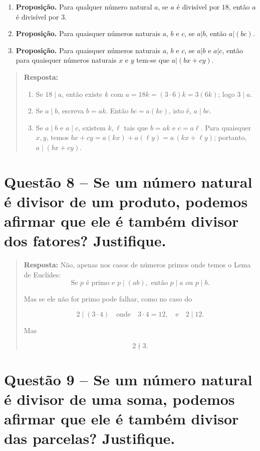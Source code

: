 \documentclass[12pt,a4paper]{article}
\newcommand{\answer}[1]{\begin{quote}#1\end{quote}}
\begin{document}
    \begin{enumerate}[label= (\alph*)]
        \item \textbf{Proposição.} Para qualquer número natural $a$, se $a$ é divisível por $18$, então $a$ é divisível por $3$.

        \item \textbf{Proposição.} Para quaisquer números naturais $a$, $b$ e $c$, se $a | b$, então $a | (bc)$.

        \item \textbf{Proposição.} Para quaisquer números naturais $a$, $b$ e $c$, se $a | b$ e $a | c$, então para quaisquer números naturais $x$ e $y$ tem-se que $a | (bx + cy)$.
    \end{enumerate}
    \answer{\textbf{Resposta:}
        \begin{enumerate}[label= (\alph*)]
            \item Se $18 \mid a$, então existe $k$ com $a = 18k = (3\cdot 6)k = 3(6k)$; logo $3 \mid a$.
            \item Se $a \mid b$, escreva $b = a k$. Então $bc = a (k c)$, isto é, $a \mid bc$.
            \item Se $a \mid b$ e $a \mid c$, existem $k,\ell$ tais que $b = a k$ e $c = a \ell$. Para quaisquer $x,y$, temos $bx + cy = a(kx) + a(\ell y) = a\,(kx + \ell y)$; portanto, $a \mid (bx + cy)$.
        \end{enumerate}
    }

\section*{Questão 8 -- Se um número natural é divisor de um produto, podemos afirmar que ele é também divisor dos fatores? Justifique.}
    
    \answer{\textbf{Resposta:} Não, apenas nos casos de números primos onde temos o Lema de Euclides: 
        \[
        \text{Se } p \text{ é primo e } p \mid (ab), \text{ então } p \mid a \text{ ou } p \mid b.
        \]
        
        Mas se ele não for primo pode falhar, como no caso do
        
        \[
        2 \mid (3 \cdot 4) \quad \text{onde} \quad 3 \cdot 4 = 12, \quad \text{e} \quad 2 \mid 12.
        \]
        
        Mas 
        
        \[
        2 \nmid 3.
        \]
    }
    

\section*{Questão 9 -- Se um número natural é divisor de uma soma, podemos afirmar que ele é também divisor das parcelas? Justifique.}
\end{document}
